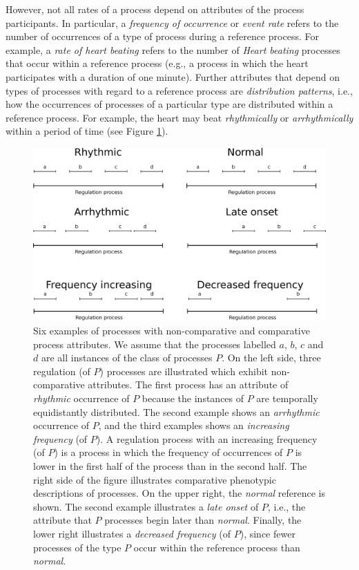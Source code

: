 \documentclass{bioinfo}
\begin{document}
However, not all rates of a process depend on attributes of the
process participants. In particular, a {\em frequency of occurrence}
or {\em event rate} refers to the number of occurrences of a type of
process during a reference process. For example, a {\em rate of heart
  beating} refers to the number of {\em Heart beating} processes that
occur within a reference process (e.g., a process in which the heart
participates with a duration of one minute). Further attributes that
depend on types of processes with regard to a reference process are
{\em distribution patterns}, i.e., how the occurrences of processes of
a particular type are distributed within a reference process. For
example, the heart may beat {\em rhythmically} or {\em arrhythmically}
within a period of time (see Figure \ref{fig:patterns}).
\begin{figure}
  \centering
  \includegraphics[width=.5\textwidth]{processpatterns.eps}
  \caption{\label{fig:patterns}Six examples of processes with
    non-comparative and comparative process attributes.  We assume
    that the processes labelled $a$, $b$, $c$ and $d$ are all
    instances of the class of processes $P$.  On the left side, three
    regulation (of $P$) processes are illustrated which exhibit
    non-comparative attributes. The first process has an attribute of
    {\em rhythmic} occurrence of $P$ because the instances of $P$ are
    temporally equidistantly distributed. The second example shows an
    {\em arrhythmic} occurrence of $P$, and the third examples shows
    an {\em increasing frequency} (of $P$). A regulation process with
    an increasing frequency (of $P$) is a process in which the
    frequency of occurrences of $P$ is lower in the first half of the
    process than in the second half. The right side of the figure
    illustrates comparative phenotypic descriptions of processes. On
    the upper right, the {\em normal} reference is shown. The second
    example illustrates a {\em late onset} of $P$, i.e., the attribute
    that $P$ processes begin later than {\em normal}. Finally, the
    lower right illustrates a {\em decreased frequency} (of $P$),
    since fewer processes of the type $P$ occur within the reference
    process than {\em normal}.}
\end{figure}
\end{document}
